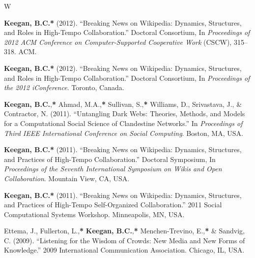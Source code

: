 \documentclass{cv}
\begin{document}
\begin{entries}{W}
		\item \textbf{Keegan, B.C.}\textbf{*} (2012). ``Breaking News on Wikipedia: Dynamics, Structures, and Roles in High-Tempo Collaboration.'' Doctoral Consortium, In \textit{Proceedings of 2012 ACM Conference on Computer-Supported Cooperative Work} (CSCW), 315--318. ACM. 
		\item \textbf{Keegan, B.C.}\textbf{*} (2012). ``Breaking News on Wikipedia: Dynamics, Structures, and Roles in High-Tempo Collaboration.'' Doctoral Consortium, In \textit{Proceedings of the 2012 iConference}. Toronto, Canada.
		\item \textbf{Keegan, B.C.},\textbf{*} Ahmad, M.A.,\textbf{*} Sullivan, S.,\textbf{*} Williams, D., Srivastava, J., \& Contractor, N. (2011). ``Untangling Dark Webs: Theories, Methods, and Models for a Computational Social Science of Clandestine Networks.'' In \textit{Proceedings of Third IEEE International Conference on Social Computing}. Boston, MA, USA.
		\item \textbf{Keegan, B.C.}\textbf{*} (2011). ``Breaking News on Wikipedia: Dynamics, Structures, and Practices of High-Tempo Collaboration.'' Doctoral Symposium, In \textit{Proceedings of the Seventh International Symposium on Wikis and Open Collaboration}. Mountain View, CA, USA.
		\item \textbf{Keegan, B.C.}\textbf{*} (2011). ``Breaking News on Wikipedia: Dynamics, Structures, and Practices of High-Tempo Self-Organized Collaboration.'' 2011 Social Computational Systems Workshop. Minneapolis, MN, USA.
		\item Ettema, J., Fullerton, L.,\textbf{*} \textbf{Keegan, B.C.},\textbf{*} Menchen-Trevino, E.,\textbf{*} \& Sandvig, C. (2009). ``Listening for the Wisdom of Crowds: New Media and New Forms of Knowledge.'' 2009 International Communication Association. Chicago, IL, USA.
	\end{entries}
\end{document}
